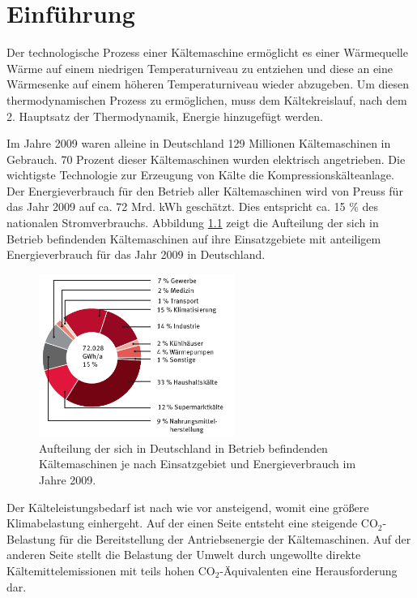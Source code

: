 \chapter{Einführung}
\label{cha:Einfuehrung}

Der technologische Prozess einer Kältemaschine ermöglicht es einer Wärmequelle Wärme  auf einem niedrigen Temperaturniveau zu entziehen und diese an eine Wärmesenke auf einem höheren Temperaturniveau wieder abzugeben. Um diesen thermodynamischen Prozess zu ermöglichen, muss dem  Kältekreislauf, nach dem 2. Hauptsatz der Thermodynamik, Energie hinzugefügt werden. 

Im Jahre 2009 waren alleine in Deutschland 129 Millionen Kältemaschinen in Gebrauch. 70 Prozent dieser Kältemaschinen wurden elektrisch angetrieben. Die wichtigste Technologie zur Erzeugung von Kälte die Kompressionskälteanlage. Der Energieverbrauch für den Betrieb aller Kältemaschinen wird von Preuss \citep{Preuss2011} für das Jahr 2009  auf  ca. 72 Mrd. kWh geschätzt. Dies entspricht ca. 15 $\%$ des nationalen Stromverbrauchs.  Abbildung \ref{fig:Aufteilung nach Einsatzgebiet} zeigt die Aufteilung der sich in Betrieb befindenden Kältemaschinen auf ihre Einsatzgebiete mit anteiligem Energieverbrauch für das Jahr 2009 in Deutschland. \citep{EnergieAgenturNRW2010}

\begin{figure}[htb]
	\centering
		\includegraphics[width=0.570\textwidth]{Pictures/Energieverbrauch_Aufteilung_Karlsruhe.png}
	\caption{Aufteilung der sich in Deutschland in Betrieb befindenden Kältemaschinen je nach Einsatzgebiet und Energieverbrauch im Jahre 2009. \citep{M.Stoeckner2012} \citep{Preuss2011}}
	\label{fig:Aufteilung nach Einsatzgebiet}
\end{figure}

Der Kälteleistungsbedarf ist nach wie vor ansteigend, womit eine größere Klimabelastung einhergeht. Auf der einen Seite entsteht eine steigende CO$_{2}$-Belastung für die Bereitstellung der Antriebsenergie der Kältemaschinen. Auf der anderen Seite stellt die Belastung der Umwelt durch ungewollte direkte Kältemittelemissionen mit teils hohen CO$_2$-Äquivalenten eine Herausforderung dar.

